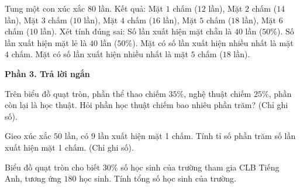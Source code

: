\begin{ex} %
Tung một con xúc xắc $80$ lần. Kết quả: Mặt $1$ chấm ($12$ lần), Mặt $2$ chấm ($14$ lần), Mặt $3$ chấm ($10$ lần), Mặt $4$ chấm ($16$ lần), Mặt $5$ chấm ($18$ lần), Mặt $6$ chấm ($10$ lần). Xét tính đúng sai:
\choiceTF
{\True Số lần xuất hiện mặt chẵn là $40$ lần ($50\%$).}
{\True Số lần xuất hiện mặt lẻ là $40$ lần ($50\%$).}
{Mặt có số lần xuất hiện nhiều nhất là mặt $4$ chấm.}
{\True Mặt có số lần xuất hiện nhiều nhất là mặt $5$ chấm ($18$ lần).}
\end{ex}

\textbf{Phần 3. Trả lời ngắn}

\begin{ex} %
Trên biểu đồ quạt tròn, phần thể thao chiếm $35\%$, nghệ thuật chiếm $25\%$, phần còn lại là học thuật. Hỏi phần học thuật chiếm bao nhiêu phần trăm? (Chỉ ghi số).
\end{ex}

\begin{ex} %
Gieo xúc xắc $50$ lần, có $9$ lần xuất hiện mặt 1 chấm. Tính tỉ số phần trăm số lần xuất hiện mặt 1 chấm. (Chỉ ghi số).
\end{ex}

\begin{ex} %
Biểu đồ quạt tròn cho biết $30\%$ số học sinh của trường tham gia CLB Tiếng Anh, tương ứng $180$ học sinh. Tính tổng số học sinh của trường.
\end{ex}

